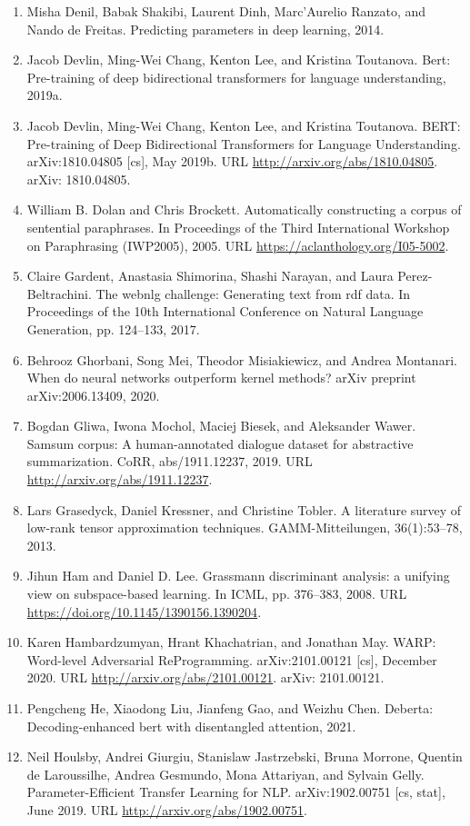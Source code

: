 \documentclass[11pt,UTF8,fontset=fandol]{ctexart}
\begin{document}
\begin{enumerate}[leftmargin=2em,itemsep=2pt]
\item Misha Denil, Babak Shakibi, Laurent Dinh, Marc'Aurelio Ranzato, and Nando de Freitas. Predicting parameters in deep learning, 2014.
\item Jacob Devlin, Ming-Wei Chang, Kenton Lee, and Kristina Toutanova. Bert: Pre-training of deep bidirectional transformers for language understanding, 2019a.
\item Jacob Devlin, Ming-Wei Chang, Kenton Lee, and Kristina Toutanova. BERT: Pre-training of Deep Bidirectional Transformers for Language Understanding. arXiv:1810.04805 [cs], May 2019b. URL \url{http://arxiv.org/abs/1810.04805}. arXiv: 1810.04805.
\item William B. Dolan and Chris Brockett. Automatically constructing a corpus of sentential paraphrases. In Proceedings of the Third International Workshop on Paraphrasing (IWP2005), 2005. URL \url{https://aclanthology.org/I05-5002}.
\item Claire Gardent, Anastasia Shimorina, Shashi Narayan, and Laura Perez-Beltrachini. The webnlg challenge: Generating text from rdf data. In Proceedings of the 10th International Conference on Natural Language Generation, pp. 124--133, 2017.
\item Behrooz Ghorbani, Song Mei, Theodor Misiakiewicz, and Andrea Montanari. When do neural networks outperform kernel methods? arXiv preprint arXiv:2006.13409, 2020.
\item Bogdan Gliwa, Iwona Mochol, Maciej Biesek, and Aleksander Wawer. Samsum corpus: A human-annotated dialogue dataset for abstractive summarization. CoRR, abs/1911.12237, 2019. URL \url{http://arxiv.org/abs/1911.12237}.
\item Lars Grasedyck, Daniel Kressner, and Christine Tobler. A literature survey of low-rank tensor approximation techniques. GAMM-Mitteilungen, 36(1):53--78, 2013.
\item Jihun Ham and Daniel D. Lee. Grassmann discriminant analysis: a unifying view on subspace-based learning. In ICML, pp. 376--383, 2008. URL \url{https://doi.org/10.1145/1390156.1390204}.
\item Karen Hambardzumyan, Hrant Khachatrian, and Jonathan May. WARP: Word-level Adversarial ReProgramming. arXiv:2101.00121 [cs], December 2020. URL \url{http://arxiv.org/abs/2101.00121}. arXiv: 2101.00121.
\item Pengcheng He, Xiaodong Liu, Jianfeng Gao, and Weizhu Chen. Deberta: Decoding-enhanced bert with disentangled attention, 2021.
\item Neil Houlsby, Andrei Giurgiu, Stanislaw Jastrzebski, Bruna Morrone, Quentin de Laroussilhe, Andrea Gesmundo, Mona Attariyan, and Sylvain Gelly. Parameter-Efficient Transfer Learning for NLP. arXiv:1902.00751 [cs, stat], June 2019. URL \url{http://arxiv.org/abs/1902.00751}.

\end{enumerate}
\end{document}
